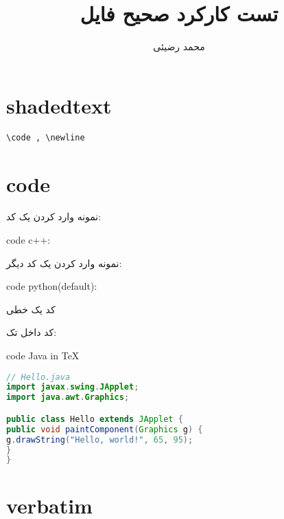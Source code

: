 \documentclass[12pt]{article}
\title{تست کارکرد صحیح فایل}
\author{محمد رضیئی}
\begin{document}
{}
\maketitle

\section{shadedtext}
\ptext[1]
\begin{shadedtext}
	\ptext[1-10]
\end{shadedtext}
\ptext[1]
\verb|\code , \newline |

\section{code}
	نمونه وارد کردن یک کد:

\begin{latin}
\noindent code c++:

\end{latin}	

\newlines



نمونه وارد کردن یک کد دیگر:

	
\begin{latin}
\noindent code python(default):

\end{latin}
کد یک خطی

کد داخل تک:
\begin{latin}
\noindent code Java in \TeX
\begin{lstlisting}[language = Java]
// Hello.java
import javax.swing.JApplet;
import java.awt.Graphics;

public class Hello extends JApplet {
public void paintComponent(Graphics g) {
g.drawString("Hello, world!", 65, 95);
}    
}
\end{lstlisting}
\end{latin}
\currentpagecolor

\section{verbatim} %
\end{document}
